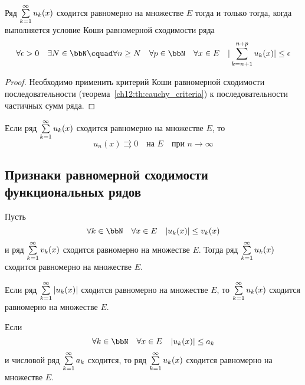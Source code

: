 \begin{thm}
	\label{ch12:th:cauchy_criteria_series}
	Ряд $\sum_{k=1}^{\infty}\limits u_k(x)$ сходится равномерно на множестве $E$ тогда
	и только тогда, когда выполняется условие Коши равномерной сходимости ряда
	\begin{equation}
		\label{ch12:p1:eq:cauchy_cond_series}
		\forall \epsilon > 0 \quad \exists N \in \bbN \cquad
			\forall n \ge N \quad \forall p \in \bbN \quad \forall x \in E \quad
			|\sum_{k=n+1}^{n+p} u_k(x)| \le \epsilon
	\end{equation}
\end{thm}
\begin{proof}
	Необходимо применить критерий Коши равномерной сходимости последовательности
	(теорема~\ref{ch12:th:cauchy_criteria}) к последовательности частичных сумм ряда.
\end{proof}
\begin{cons}
	Если ряд $\sum_{k=1}^{\infty}\limits u_k(x)$ сходится равномерно на множестве $E$,
	то
	$$
		u_n(x) \rightrightarrows 0 \quad \text{на } E \quad \text{при } n \to \infty
	$$
\end{cons}


\subsection*{Признаки равномерной сходимости функциональных рядов}

\begin{thm}
	Пусть
	$$
		\forall k \in \bbN \quad \forall x \in E \quad |u_k(x)| \le v_k(x)
	$$
	и ряд $\sum_{k=1}^{\infty}\limits v_k(x)$ сходится равномерно на множестве $E$.
	Тогда ряд $\sum_{k=1}^{\infty}\limits u_k(x)$ сходится равномерно на множестве $E$.
\end{thm}
\begin{cons}
	Если ряд $\sum_{k=1}^{\infty}\limits |u_k(x)|$ сходится равномерно на множестве $E$,
	то $\sum_{k=1}^{\infty}\limits u_k(x)$ сходится равномерно на множестве $E$.
\end{cons}

\begin{thm}
	Если
	$$
		\forall k \in \bbN \quad \forall x \in E \quad |u_k(x)| \le a_k
	$$
	и числовой ряд $\sum_{k=1}^{\infty}\limits a_k$ сходится, то
	ряд $\sum_{k=1}^{\infty}\limits u_k(x)$ сходится равномерно на множестве $E$.
\end{thm}

